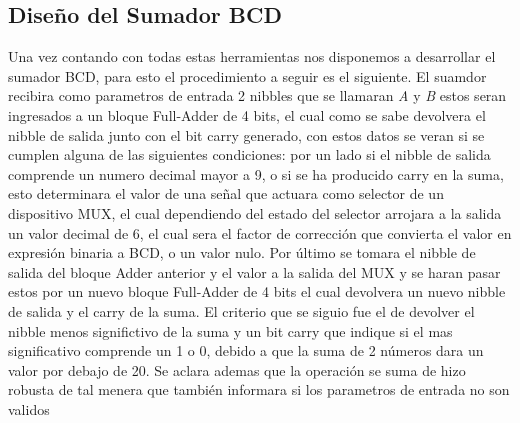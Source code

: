 \subsection{Diseño del Sumador BCD}
  Una vez contando con todas estas herramientas nos disponemos a desarrollar el sumador BCD, para esto el procedimiento a seguir es el siguiente. El suamdor recibira como parametros de entrada 2 nibbles que se llamaran \emph{A} y \emph{B} estos seran ingresados a un bloque Full-Adder de 4 bits, el cual como se sabe devolvera el nibble de salida junto con el bit carry generado, con estos datos se veran si se cumplen alguna de las siguientes condiciones: por un lado si el nibble de salida comprende un numero decimal mayor a 9, o si se ha producido carry en la suma, esto determinara el valor de una señal que actuara como selector de un dispositivo MUX, el cual dependiendo del estado del selector arrojara a la salida un valor decimal de 6, el cual sera el factor de corrección que convierta el valor en expresión binaria a BCD,  o un valor nulo. Por último se tomara el nibble de salida del bloque Adder anterior y el valor a la salida del MUX y se haran pasar estos por un nuevo bloque Full-Adder de 4 bits el cual devolvera un nuevo nibble de salida y el carry de la suma. El criterio que se siguio fue el de devolver el nibble menos significtivo de la suma y un bit carry que indique si el mas significativo comprende un 1 o 0, debido a que la suma de 2 números dara un valor por debajo de 20. Se aclara ademas que la operación se suma de hizo robusta de tal menera que también informara si los parametros de entrada no son validos